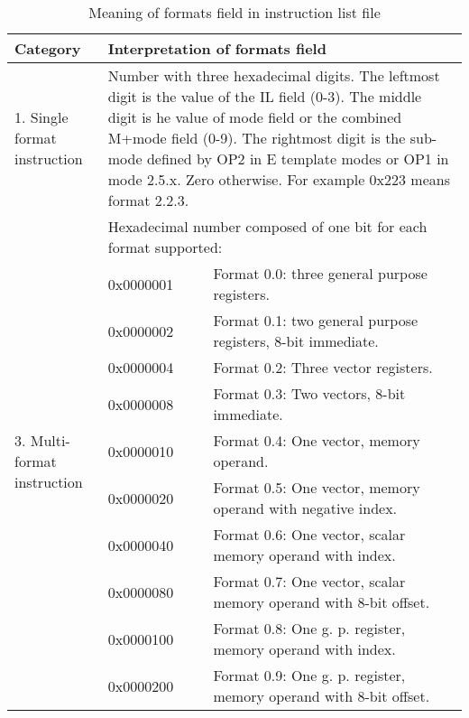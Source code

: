 \documentclass[forwardcom.tex]{subfiles}
\begin{document}
\pagebreak %
\label{table_format_field_in_list}
\begin{longtable} {|p{18mm}|p{20mm} p{80mm}|}
\caption{Meaning of formats field in instruction list file} 
\label{table:MeaningOfFormatsFieldInInstructionListFile}
\\
\endfirsthead
\endhead
\hline
\bfseries Category & \multicolumn{2}{|l|}{\bfseries Interpretation of formats field} \\
\hline
1.  Single format instruction & \multicolumn{2}{|p{102mm}|}{
Number with three hexadecimal digits. \newline
The leftmost digit is the value of the IL field (0-3). \newline
The middle digit is he value of mode field or the combined M+mode field (0-9).\newline
The rightmost digit is the sub-mode defined by OP2 in E template modes or OP1 in mode 2.5.x. Zero otherwise. \newline
For example 0x223 means format 2.2.3.
}  \\
\hline
\multirow{27}{*}{\parbox[t]{18mm}{3. Multi-format instruction}} 
  &  \multicolumn{2}{|l|}{
     Hexadecimal number composed of one bit for each format supported:} \\
  &  0x0000001 & Format 0.0: three general purpose registers. \\
  &  0x0000002 & Format 0.1: two general purpose registers, 8-bit immediate. \\
  &  0x0000004 & Format 0.2: Three vector registers. \\
  &  0x0000008 & Format 0.3: Two vectors, 8-bit immediate. \\
  &  0x0000010 & Format 0.4: One vector, memory operand. \\
  &  0x0000020 & Format 0.5: One vector, memory operand with negative index. \\
  &  0x0000040 & Format 0.6: One vector, scalar memory operand with index. \\
  &  0x0000080 & Format 0.7: One vector, scalar memory operand with 8-bit offset. \\
  &  0x0000100 & Format 0.8: One g. p. register, memory operand with index. \\
  &  0x0000200 & Format 0.9: One g. p. register, memory operand with 8-bit offset. \\
  

\end{longtable}
\end{document}

